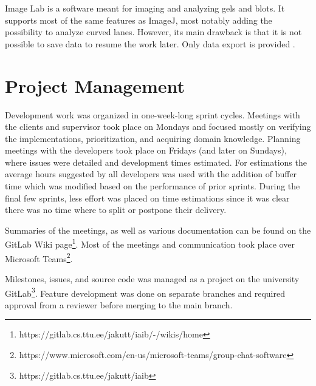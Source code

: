 Image Lab is a software meant for imaging and analyzing gels and blots. It supports most of the same features as ImageJ, most notably adding the possibility to analyze curved lanes.
However, its main drawback is that it is not possible to save data to resume the work later. Only data export is provided \cite{image-lab}.

\section{Project Management}

Development work was organized in one-week-long sprint cycles. Meetings with the clients and supervisor took place on Mondays and focused mostly on verifying the implementations, prioritization, and acquiring domain knowledge. Planning meetings with the developers took place on Fridays (and later on Sundays), where issues were detailed and development times estimated. For estimations the average hours suggested by all developers was used with the addition of buffer time which was modified based on the performance of prior sprints. During the final few sprints, less effort was placed on time estimations since it was clear there was no time where to split or postpone their delivery.

Summaries of the meetings, as well as various documentation can be found on the GitLab Wiki page\footnote{https://gitlab.cs.ttu.ee/jakutt/iaib/-/wikis/home}. Most of the meetings and communication took place over Microsoft Teams\footnote{https://www.microsoft.com/en-us/microsoft-teams/group-chat-software}.

Milestones, issues, and source code was managed as a project on the university GitLab\footnote{https://gitlab.cs.ttu.ee/jakutt/iaib}. Feature development was done on separate branches and required approval from a reviewer before merging to the main branch.
